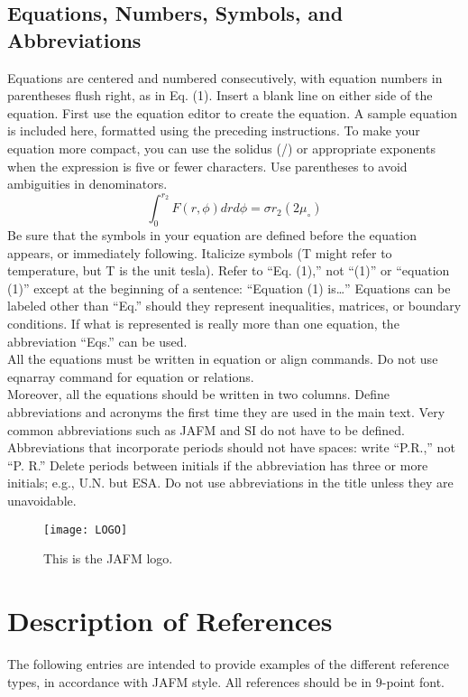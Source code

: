\documentclass{jafm}
\begin{document}
\subsection{Equations, Numbers, Symbols, and Abbreviations}
Equations are centered and numbered consecutively, with equation numbers in parentheses flush right, as in Eq. (1). Insert a blank line on either side of the equation. First use the equation editor to create the equation. 
A sample equation is included here, formatted using the preceding instructions. To make your equation more compact, you can use the solidus (/) or appropriate exponents when the expression is five or fewer characters.  Use parentheses to avoid ambiguities in denominators.
\begin{equation}
\int_0^{r_2} F(r , \phi) dr d\phi = \sigma r_2 (2\mu_{\circ})
\end{equation}
Be sure that the symbols in your equation are defined before the equation appears, or immediately following. Italicize symbols (T might refer to temperature, but T is the unit tesla). Refer to ``Eq. (1),'' not ``(1)'' or ``equation (1)'' except at the beginning of a sentence: ``Equation (1) is\ldots'' Equations can be labeled other than ``Eq.'' should they represent inequalities, matrices, or boundary conditions. If what is represented is really more than one equation, the abbreviation ``Eqs.'' can be used.\\
All the equations must be written in equation or align commands. Do not use eqnarray command for equation or relations.\\
Moreover, all the equations should be written in two columns.   
Define abbreviations and acronyms the first time they are used in the main text. Very common abbreviations such as JAFM and SI do not have to be defined. Abbreviations that incorporate periods should not have spaces: write ``P.R.,'' not ``P. R.'' Delete periods between initials if the abbreviation has three or more initials; e.g., U.N. but ESA. Do not use abbreviations in the title unless they are unavoidable.
\begin{figure}
  \centering
  \texttt{[image: LOGO]}\\
  \caption[]{ This is the JAFM logo. }
  \label{fig:logo}
\end{figure}
\section{Description of References}
The following entries are intended to provide examples of the different reference types, in accordance with JAFM style. All references should be in 9-point font.
\end{document}
